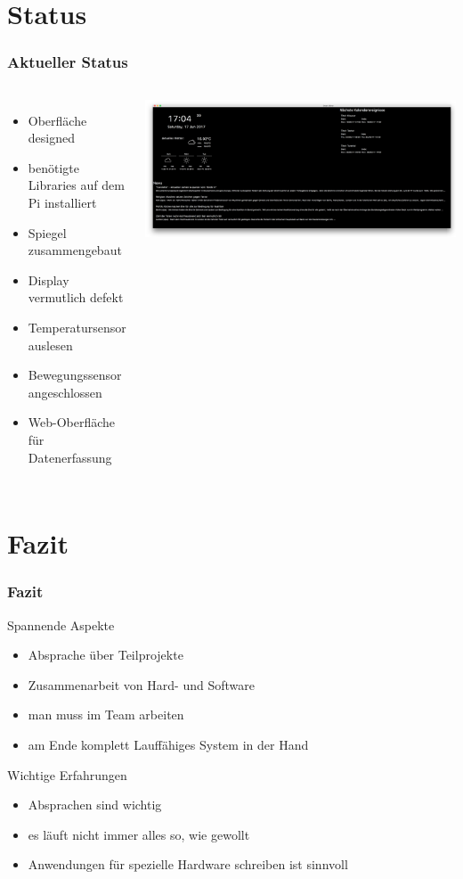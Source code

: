 \documentclass[11pt]{beamer}
\newcommand{\cmark}{\ding{51}}%
\newcommand{\xmark}{\ding{55}}%
\begin{document}
	\section{Status}
	\begin{frame}
		\frametitle{Aktueller Status}
			\begin{columns}
				\column{.5\paperwidth}
					\begin{itemize}
						\item[\cmark] Oberfl\"ache designed
						\item[\cmark] ben\"otigte Libraries auf dem Pi installiert
						\item[\cmark] Spiegel zusammengebaut
						\item[\xmark] Display vermutlich defekt
						\item[\xmark] Temperatursensor auslesen
						\item[\xmark] Bewegungssensor angeschlossen
						\item Web-Oberfl\"ache f\"ur Datenerfassung
					\end{itemize}
				\column{.4\paperwidth}
					\includegraphics[width=.4\paperwidth]{images/titlepage}
			\end{columns}
	\end{frame}
	
	\section{Fazit}
	\begin{frame}
		\frametitle{Fazit}
		\centering
		\begin{block}{Spannende Aspekte}
			\begin{itemize}
				\item Absprache \"uber Teilprojekte
				\item Zusammenarbeit von Hard- und Software
				\item man muss im Team arbeiten
				\item am Ende komplett Lauff\"ahiges System in der Hand
			\end{itemize}
		\end{block}
		\pause
		\begin{block}{Wichtige Erfahrungen}
			\begin{itemize}
				\item Absprachen sind wichtig
				\item es l\"auft nicht immer alles so, wie gewollt
				\item Anwendungen f\"ur spezielle Hardware schreiben ist sinnvoll
			\end{itemize}
		\end{block}
	\end{frame}
\end{document}
